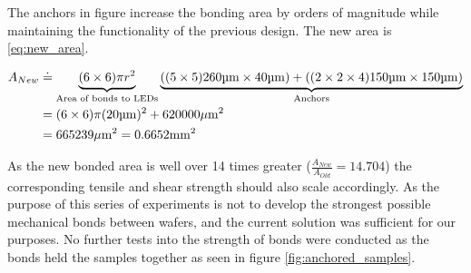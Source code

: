 The anchors in figure increase the bonding area by orders of magnitude while maintaining the functionality of the previous design.
The new area is \ref{eq:new_area}.


\begin{equation} \label{eq:new_area}
    \begin{split}
        A_{New} &\doteq \underbrace{(6\times 6) \pi r^2}_{\text{Area of bonds to LEDs}} \underbrace{((5\times 5) 260\um \times 40\um) + ((2\times 2 \times 4) 150\um \times 150 \um)}_{\text{Anchors}} \\
        &= (6\times 6) \pi (20 \um)^2  + 620000 \umm \\
        &= 665239 \umm = 0.6652 \mm^2
    \end{split}
\end{equation}

As the new bonded area is well over 14 times greater ($ \frac{A_{New}}{A_{Old}} = 14.704$) the corresponding tensile and shear strength should also scale accordingly.
As the purpose of this series of experiments is not to develop the strongest possible mechanical bonds between wafers, and the current solution was sufficient for our purposes. No further tests into the strength of bonds were conducted as the bonds held the samples together as seen in figure \ref{fig:anchored_samples}.


